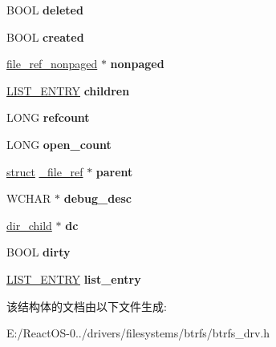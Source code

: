 \begin{DoxyCompactItemize}
B\+O\+OL {\bfseries deleted}
\item 
\mbox{\label{struct__file__ref_a5a61baa05887a775c35f69493b664f1d}} 
B\+O\+OL {\bfseries created}
\item 
\mbox{\label{struct__file__ref_af5d14ffe92d2165451f695273034c270}} 
\hyperlink{structfile__ref__nonpaged}{file\+\_\+ref\+\_\+nonpaged} $\ast$ {\bfseries nonpaged}
\item 
\mbox{\label{struct__file__ref_a9c95755690be8158118c2faa1f429e7c}} 
\hyperlink{struct___l_i_s_t___e_n_t_r_y}{L\+I\+S\+T\+\_\+\+E\+N\+T\+RY} {\bfseries children}
\item 
\mbox{\label{struct__file__ref_a1d342ebef8c118524030863ba20cf007}} 
L\+O\+NG {\bfseries refcount}
\item 
\mbox{\label{struct__file__ref_ac3a2b3ec7f33564c2a2953b01226bc12}} 
L\+O\+NG {\bfseries open\+\_\+count}
\item 
\mbox{\label{struct__file__ref_a35133a4a6535f1b4a29d7b9b706c822b}} 
\hyperlink{interfacestruct}{struct} \hyperlink{struct__file__ref}{\+\_\+file\+\_\+ref} $\ast$ {\bfseries parent}
\item 
\mbox{\label{struct__file__ref_a570b7073181610355d25196711b25f7d}} 
W\+C\+H\+AR $\ast$ {\bfseries debug\+\_\+desc}
\item 
\mbox{\label{struct__file__ref_a3aad041fa1868ea40dadc051ad2aa5ea}} 
\hyperlink{structdir__child}{dir\+\_\+child} $\ast$ {\bfseries dc}
\item 
\mbox{\label{struct__file__ref_a6e9b557aea95d9e55d138bf0793b5cd9}} 
B\+O\+OL {\bfseries dirty}
\item 
\mbox{\label{struct__file__ref_a90742072a57b946ad1801f590c438933}} 
\hyperlink{struct___l_i_s_t___e_n_t_r_y}{L\+I\+S\+T\+\_\+\+E\+N\+T\+RY} {\bfseries list\+\_\+entry}
\end{DoxyCompactItemize}


该结构体的文档由以下文件生成\+:\begin{DoxyCompactItemize}
\item 
E\+:/\+React\+O\+S-\/0../drivers/filesystems/btrfs/btrfs\+\_\+drv.\+h\end{DoxyCompactItemize}
